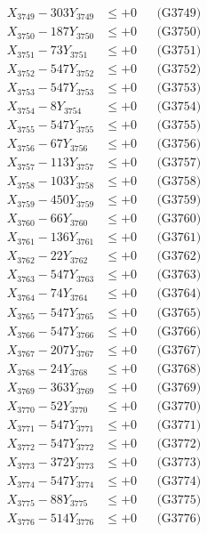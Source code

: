 \documentclass[a4paper,10pt]{article}
\begin{document}
{\begin{align}
X_{3749} - 303Y_{3749} &\leq +0 && \text{(G3749)} \\
X_{3750} - 187Y_{3750} &\leq +0 && \text{(G3750)} \\
\allowbreak
X_{3751} - 73Y_{3751} &\leq +0 && \text{(G3751)} \\
X_{3752} - 547Y_{3752} &\leq +0 && \text{(G3752)} \\
X_{3753} - 547Y_{3753} &\leq +0 && \text{(G3753)} \\
X_{3754} - 8Y_{3754} &\leq +0 && \text{(G3754)} \\
X_{3755} - 547Y_{3755} &\leq +0 && \text{(G3755)} \\
X_{3756} - 67Y_{3756} &\leq +0 && \text{(G3756)} \\
X_{3757} - 113Y_{3757} &\leq +0 && \text{(G3757)} \\
X_{3758} - 103Y_{3758} &\leq +0 && \text{(G3758)} \\
X_{3759} - 450Y_{3759} &\leq +0 && \text{(G3759)} \\
X_{3760} - 66Y_{3760} &\leq +0 && \text{(G3760)} \\
\allowbreak
X_{3761} - 136Y_{3761} &\leq +0 && \text{(G3761)} \\
X_{3762} - 22Y_{3762} &\leq +0 && \text{(G3762)} \\
X_{3763} - 547Y_{3763} &\leq +0 && \text{(G3763)} \\
X_{3764} - 74Y_{3764} &\leq +0 && \text{(G3764)} \\
X_{3765} - 547Y_{3765} &\leq +0 && \text{(G3765)} \\
X_{3766} - 547Y_{3766} &\leq +0 && \text{(G3766)} \\
X_{3767} - 207Y_{3767} &\leq +0 && \text{(G3767)} \\
X_{3768} - 24Y_{3768} &\leq +0 && \text{(G3768)} \\
X_{3769} - 363Y_{3769} &\leq +0 && \text{(G3769)} \\
X_{3770} - 52Y_{3770} &\leq +0 && \text{(G3770)} \\
\allowbreak
X_{3771} - 547Y_{3771} &\leq +0 && \text{(G3771)} \\
X_{3772} - 547Y_{3772} &\leq +0 && \text{(G3772)} \\
X_{3773} - 372Y_{3773} &\leq +0 && \text{(G3773)} \\
X_{3774} - 547Y_{3774} &\leq +0 && \text{(G3774)} \\
X_{3775} - 88Y_{3775} &\leq +0 && \text{(G3775)} \\
X_{3776} - 514Y_{3776} &\leq +0 && \text{(G3776)} \\

\end{align}}
\end{document}
